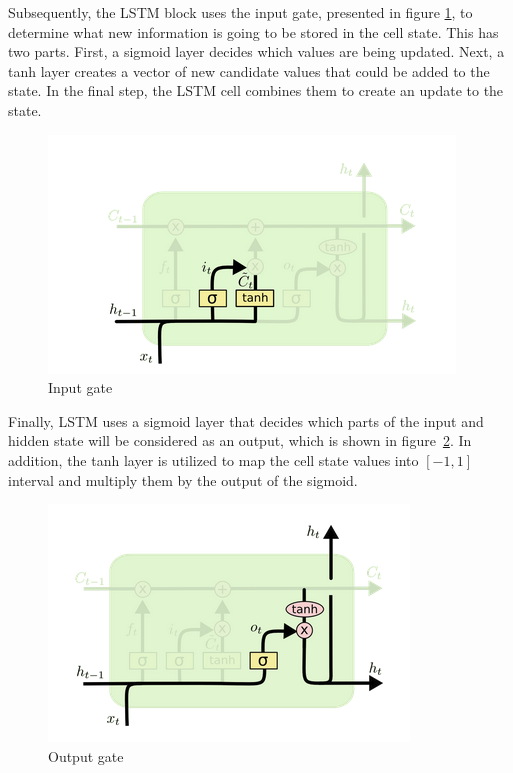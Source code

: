\documentclass[11pt]{article}
\begin{document}
Subsequently, the LSTM block uses the input gate, presented in figure \ref{fig:inputGate}, to determine what new information is going to be stored in the cell state. This has two parts. First, a sigmoid layer decides which values are being updated. Next, a tanh layer creates a vector of new candidate values that could be added to the state. In the final step, the LSTM cell combines them to create an update to the state.

\begin{figure}[h]
    \centering
    \includegraphics[width=\columnwidth]{img/InputGate.png}
    \caption{Input gate} 
    \label{fig:inputGate}
\end{figure}

Finally, LSTM uses a sigmoid layer that decides which parts of the input and hidden state will be considered as an output, which is shown in figure~\ref{fig:outputGate}. In addition, the tanh layer is utilized to map the cell state values into $[-1, 1]$ interval and multiply them by the output of the sigmoid.

\begin{figure}[h]
    \centering
    \includegraphics[width=\columnwidth]{img/outputGate.png}
    \caption{Output gate} 
    \label{fig:outputGate}
\end{figure}
\end{document}
